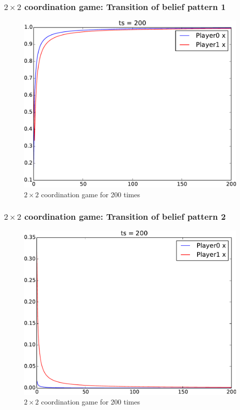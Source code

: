 \documentclass[dvipdfmx,fleqn]{beamer}
\begin{document}
\begin{frame}
\frametitle{$2\times2$ coordination game: Transition of belief pattern 1}
\begin{figure}
 \centering
 \includegraphics[width=0.7\linewidth]{2coordgame200_1.pdf}
 \caption{$2\times2$ coordination game for 200 times}
 \label{fig:2coordgame200_1.pdf}
\end{figure}
\end{frame}


\begin{frame}
\frametitle{$2\times2$ coordination game: Transition of belief pattern 2}
\begin{figure}
 \centering
 \includegraphics[width=0.7\linewidth]{2coordgame200_2.pdf}
 \caption{$2\times2$ coordination game for 200 times}
 \label{fig:2coordgame200_2}
\end{figure}
\end{frame}
\end{document}

